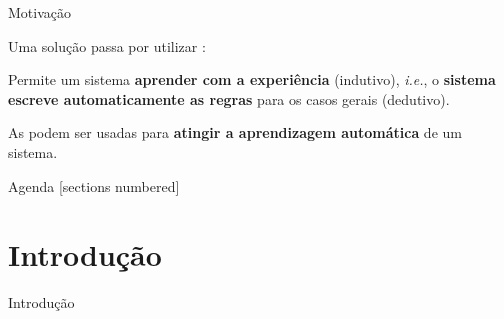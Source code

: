 \begin{frame}{Motivação \cont}


    \pauseskip

    Uma solução passa por utilizar :
    \begin{figure}
        \centering
        
    \end{figure}
    
    \pauseskip
    
    Permite um sistema \textbf{aprender com a experiência} (indutivo), \textit{i.e.}, o \textbf{sistema escreve automaticamente as regras} para os casos gerais (dedutivo).

    \pauseskip
   
    As  podem ser usadas para \textbf{atingir a aprendizagem automática} de um sistema. 
    
\end{frame}


\begin{frame}{Agenda}
  [sections numbered]
  \tableofcontents%
\end{frame}

\section{Introdução}

\begin{frame}{Introdução}

    
    \medskip

    \begin{figure}
			\centering
			\resizebox{!}{0.65\linewidth}{
				
			}
	\end{figure}
	
\end{frame}

